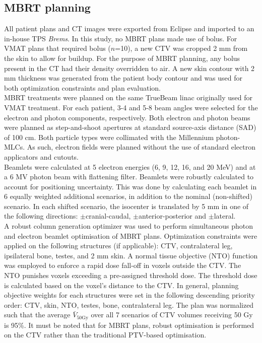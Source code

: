 \documentclass[aapm,graphicx,superscriptaddress]{revtex4-1}
\newcommand*\mean[1]{\bar{#1}}
\begin{document}
\subsection{MBRT planning}
All patient plans and CT images were exported from Eclipse and imported to an in-house TPS \textit{Brems}. In this study, no MBRT plans made use of bolus. For VMAT plans that required bolus ($n$=10), a new CTV was cropped 2 mm from the skin to allow for buildup. 
For the purpose of MBRT planning, any bolus present in the CT had their density overridden to air. A new skin contour with 2 mm thickness was generated from the patient body contour and was used for both optimization constraints and plan evaluation.\\
MBRT treatments were planned on the same TrueBeam linac originally used for VMAT treatment. For each patient, 3-4 and 5-8 beam angles were selected for the electron and photon components, respectively. Both electron and photon beams were planned as step-and-shoot apertures at standard source-axis distance (SAD) of 100 cm. Both particle types were collimated with the Millennium photon-MLCs. As such, electron fields were planned without the use of standard electron applicators and cutouts.\\
Beamlets were calculated at 5 electron energies (6, 9, 12, 16, and 20 MeV) and at a 6 MV photon beam with flattening filter. Beamlets were robustly calculated to account for positioning uncertainty. This was done by calculating each beamlet in 6 equally weighted additional scenarios, in addition to the nominal (non-shifted) scenario. In each shifted scenario, the isocenter is translated by 5 mm in one of the following directions: $\pm$cranial-caudal, $\pm$anterior-posterior and $\pm$lateral.\\ 
A robust column generation optimizer \cite{Renaud2019} was used to perform simultaneous photon and electron beamlet optimisation of MBRT plans. Optimization constraints were applied on the following structures (if applicable): CTV, contralateral leg, ipsilateral bone, testes, and 2 mm skin. A normal tissue objective (NTO) function was employed to enforce a rapid dose fall-off in voxels outside the CTV. The NTO punishes voxels exceeding a pre-assigned threshold dose. The threshold dose is calculated based on the voxel's distance to the CTV. In general, planning objective weights for each structures were set in the following descending priority order: CTV, skin, NTO, testes, bone, contralateral leg. The plan was normalized such that the average $\mean{V}_{50\text{Gy}}$ over all 7 scenarios of CTV volumes receiving 50 Gy is 95\%. It must be noted that for MBRT plans, robust optimisation is performed on the CTV rather than the traditional PTV-based optimisation.\\
\end{document}
